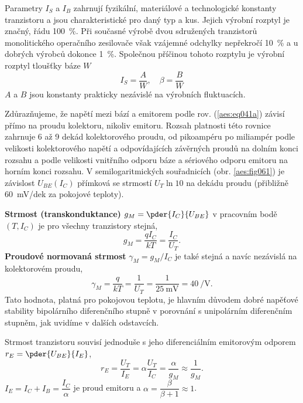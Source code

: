       Parametry \(I_S\) a \(I_B\) zahrnují fyzikální, materiálové a technologické konstanty
      tranzistoru a jsou charakteristické pro daný typ a kus. Jejich výrobní rozptyl je značný, řádu
      \qty{100}{\percent}. Při současné výrobě dvou sdružených tranzistorů monolitického operačního
      zesilovače však vzájemné odchylky nepřekročí \qty{10}{\percent} a u dobrých výrobců dokonce
      \qty{1}{\percent}.  Společnou příčinou tohoto rozptylu je výrobní rozptyl tloušťky báze \(W\)
      \begin{equation}\label{aes:eq042}
        I_S = \dfrac{A}{W}, \quad \beta = \dfrac{B}{W}
      \end{equation}   
      \(A\) a \(B\) jsou konstanty prakticky nezávislé na výrobních fluktuacích.

      Zdůrazňujeme, že napětí mezi bází a emitorem podle rov. (\ref{aes:eq041a}) závisí přímo na
      proudu kolektoru, nikoliv emitoru. Rozsah platnosti této rovnice zahrnuje 6 až 9 dekád
      kolektorového proudu, od pikoampéru po miliampér podle velikosti kolektorového napětí a
      odpovídajících závěrných proudů na dolním konci rozsahu a podle velikosti vnitřního odporu
      báze a sériového odporu emitoru na horním konci rozsahu. V semilogaritmických souřadnicích
      (obr. \ref{aes:fig061}) je závislost \(U_{BE}(I_C)\) přímková se strmostí \(U_T\ln10\) na
      dekádu proudu (přibližně \qty{60}{\mV}/dek za pokojové teploty).

      \textbf{Strmost (transkonduktance)} \(g_M = \pder{I_C}{U_{BE}}\) v pracovním bodě \((T, I_C)\)
      je pro všechny tranzistory stejná,
      \begin{equation}\label{aes:eq043}
        g_M = \dfrac{qI_C}{kT}  = \dfrac{I_C}{U_T}.
      \end{equation} 
      \textbf{Proudové normovaná strmost} \(\gamma_M = g_M/I_C\) je také stejná a navíc nezávislá
      na kolektorovém proudu,
      \begin{equation}\label{aes:eq044}
        \gamma_M = \dfrac{q}{kT}  = \dfrac{1}{U_T} = \dfrac{1}{\qty{25}{\mV}} = \qty{40}{\per\V}.
      \end{equation} 
      Tato hodnota, platná pro pokojovou teplotu, je hlavním důvodem dobré napěťové stability
      bipolárního diferenčního stupně v porovnání s unipolárním diferenčním stupněm, jak uvidíme v
      dalších odstavcích.

      Strmost tranzistoru souvisí jednoduše s jeho diferenciálním emitorovým odporem \(r_E =
      \pder{U_{BE}}{I_E}\),
      \begin{equation}\label{aes:eq045}
        r_E = \dfrac{U_T}{I_E}  = \alpha\dfrac{U_T}{I_C} 
            = \dfrac{\alpha}{g_M} \approx \dfrac{1}{g_M}.
      \end{equation} 
      \(I_E = I_C + I_B = \dfrac{I_C}{\alpha}\) je proud emitoru a \(\alpha = \dfrac{\beta}{\beta +
      1} \approx 1\).

